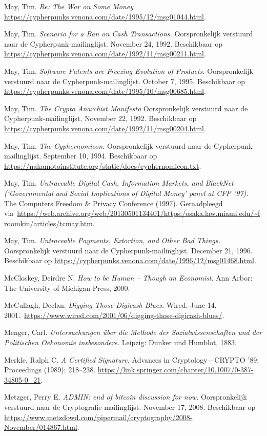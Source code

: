 \documentclass[
  a5paper,
  smalldemyvopaper,11pt,twoside,onecolumn,openright,extrafontsizes,
hidelinks]{memoir}
\begin{document}
May, Tim. \emph{Re: The War on Some Money}
\url{https://cypherpunks.venona.com/date/1995/12/msg01044.html}.

May, Tim. \emph{Scenario for a Ban on Cash Transactions.} Oorspronkelijk
verstuurd naar de Cypherpunk-mailinglijst. November 24, 1992.
Beschikbaar op
\url{https://cypherpunks.venona.com/date/1992/11/msg00211.html}.

May, Tim. \emph{Software Patents are Freezing Evolution of Products.}
Oorspronkelijk verstuurd naar de Cypherpunk-mailinglijst. October 7,
1995. Beschikbaar op
\url{https://cypherpunks.venona.com/date/1995/10/msg00685.html}.

May, Tim. \emph{The Crypto Anarchist Manifesto} Oorspronkelijk verstuurd
naar de Cypherpunk-mailinglijst, November 22, 1992. Beschikbaar op
\url{https://cypherpunks.venona.com/date/1992/11/msg00204.html}.

May, Tim. \emph{The Cyphernomicon.} Oorspronkelijk verstuurd naar de
Cypherpunk-mailinglijst. September 10, 1994. Beschikbaar op
\url{https://nakamotoinstitute.org/static/docs/cyphernomicon.txt}.

May, Tim. \emph{Untraceable Digital Cash, Information Markets, and
BlackNet (`Governmental and Social Implications of Digital Money' panel
at CFP '97).} The Computers Freedom \& Privacy Conference (1997).
Geraadpleegd
via~\url{https://web.archive.org/web/20130501134401/https:/osaka.law.miami.edu/~froomkin/articles/tcmay.htm}.

May, Tim. \emph{Untraceable Payments, Extortion, and Other Bad Things.}
Oorspronkelijk verstuurd naar de Cypherpunk-mailinglijst. December 21,
1996. Beschikbaar op
\url{https://cypherpunks.venona.com/date/1996/12/msg01468.html}.

McCloskey, Deirdre N. \emph{How to be Human -- Though an Economist}. Ann
Arbor: The University of Michigan Press, 2000.

McCullagh, Declan. \emph{Digging Those Digicash Blues.} Wired. June 14,
2001.~\url{https://www.wired.com/2001/06/digging-those-digicash-blues/}.

Menger, Carl. \emph{Untersuchungen über die Methode der
Sozialwissenschaften und der Politischen Oekonomie insbesondere}.
Leipzig: Dunker und Humblot, 1883.

Merkle, Ralph C. \emph{A Certified Signature.} Advances in
Cryptology---CRYPTO '89: Proceedings (1989): 218--238.
\url{https://link.springer.com/chapter/10.1007/0-387-34805-0_21}.

Metzger, Perry E. \emph{ADMIN: end of bitcoin discussion for now.}
Oorspronkelijk verstuurd naar de Cryptografie-mailinglijst. November 17,
2008. Beschikbaar op
\url{https://www.metzdowd.com/pipermail/cryptography/2008-November/014867.html}.
\end{document}
